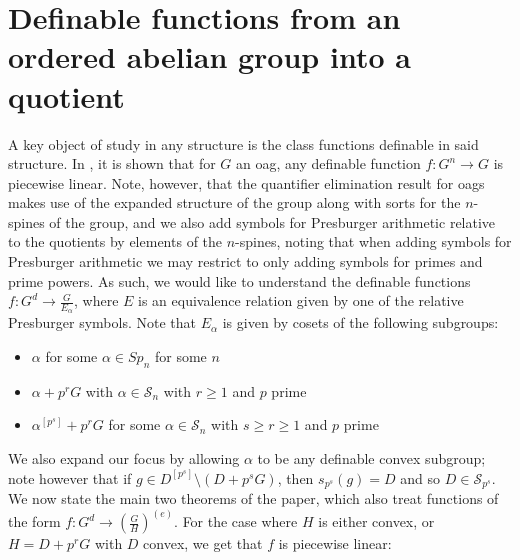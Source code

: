 \documentclass[a4paper,11pt]{article}
\newcommand{\nl}{\newline}
\newcommand{\Sn}{\mathcal{S}_n}
\begin{document}
\section{Definable functions from an ordered abelian group into a quotient}\label{main results}
A key object of study in any structure is the class functions definable in said structure. In \cite{QE}, it is shown that for $G$ an oag, any definable function $f:G^n\rightarrow G$ is piecewise linear. Note, however, that the quantifier elimination result for oags makes use of the expanded structure of the group along with sorts for the $n$-spines of the group, and we also add symbols for Presburger arithmetic relative to the quotients by elements of the $n$-spines, noting that when adding symbols for Presburger arithmetic we may restrict to only adding symbols for primes and prime powers. As such, we would like to understand the definable functions $f:G^d\rightarrow \frac{G}{E_\alpha}$, where $E$ is an equivalence relation given by one of the relative Presburger symbols.
\nl\nl
Note that $E_\alpha$ is given by cosets of the following subgroups:
\begin{itemize}
	\item $\alpha$ for some $\alpha\in Sp_n$ for some $n$
	\item $\alpha + p^rG$ with $\alpha\in \Sn$ with $r\geq 1$ and $p$ prime
	\item $\alpha^{[p^s]}+p^rG$ for some $\alpha\in \Sn$ with $s\geq r\geq 1$ and $p$ prime
\end{itemize}
We also expand our focus by allowing $\alpha$ to be any definable convex subgroup; note however that if $g\in D^{[p^s]}\setminus (D+p^sG)$, then $s_{p^s}(g) = D$ and so $D\in \mathcal{S}_{p^s}$.
\nl\nl
We now state the main two theorems of the paper, which also treat functions of the form $f:G^d\rightarrow(\frac{G}{H})^{(e)}$. For the case where $H$ is either convex, or $H= D+p^rG$ with $D$ convex, we get that $f$ is piecewise linear:
\end{document}
